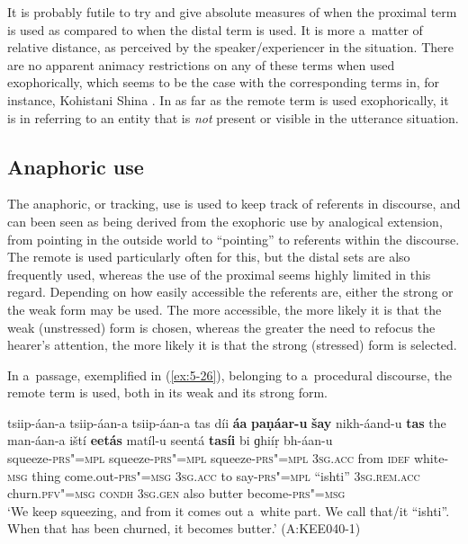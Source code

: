 It is probably futile to try and give absolute measures of when the proximal term is used as compared to when the distal term is used. It is more a~matter of relative distance, as perceived by the speaker/experiencer in the situation. There are no apparent animacy restrictions on any of these terms when used exophorically, which seems to be the case with the corresponding terms in, for instance, Kohistani Shina \citep[135]{schmidtkohistani2001}. In as far as the remote term is used exophorically, it is in referring to an entity that is \textit{not} present or visible in the utterance situation. 


\subsection{Anaphoric use}
\label{subsec:5-2-4}

The anaphoric, or tracking, use is used to keep track of referents in discourse, and can been seen as being derived from the exophoric use by analogical extension, from pointing in the outside world to ``pointing'' to referents within the discourse. The remote is used particularly often for this, but the distal sets are also frequently used, whereas the use of the proximal seems highly limited in this regard. Depending on how easily accessible the referents are, either the strong or the weak form may be used. The more accessible, the more likely it is that the weak (unstressed) form is chosen, whereas the greater the need to refocus the hearer's attention, the more likely it is that the strong (stressed) form is selected. 


In a~passage, exemplified in (\ref{ex:5-26}), belonging to a~procedural discourse, the remote term is used, both in its weak and its strong form.
 
\ea
\label{ex:5-26}
\gll tsiip-áan-a tsiip-áan-a tsiip-áan-a tas díi \textbf{áa} \textbf{paṇáar-u}
 \textbf{šay} nikh-áand-u \textbf{tas} the man-áan-a iští \textbf{eetás} matíl-u
seentá \textbf{tasíi} bi ɡhiíṛ bh-áan-u\\
squeeze-\textsc{prs"=mpl} squeeze-\textsc{prs"=mpl} squeeze-\textsc{prs"=mpl} \textsc{3sg.acc} from
\textsc{idef} white-\textsc{msg} thing come.out-\textsc{prs"=msg} \textsc{3sg.acc}
to say-\textsc{prs"=mpl} ``ishti'' \textsc{3sg.rem.acc} churn.\textsc{pfv"=msg}
\textsc{condh} \textsc{3sg.gen} also butter become-\textsc{prs"=msg}\\
\glt `We keep squeezing, and from it comes out a~white part. We call that/it ``ishti''. When that has been
churned, it becomes butter.' (A:KEE040-1)
\z

